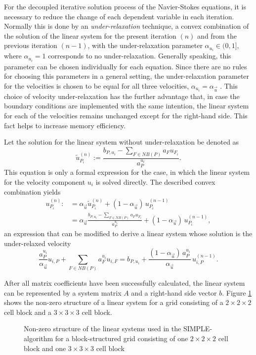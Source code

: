 For the decoupled iterative solution process of the Navier-Stokes equations, it is necessary to reduce the change of each dependent variable in each iteration. Normally this is done by an \emph{under-relaxation} technique, a convex combination of the solution of the linear system for the present iteration \((n)\) and from the previous iteration \((n-1)\), with the under-relaxation parameter \(\alpha_{u_i} \in (0,1]\), where \(\alpha_{u_i} = 1\) corresponds to no under-relaxation. Generally speaking, this parameter can be chosen individually for each equation. Since there are no rules for choosing this parameters in a general setting, the under-relaxation parameter for the velocities is chosen to be equal for all three velocities, \(\alpha_{u_i} = \alpha_{\vec{u}}\) \cite{schaefer99}. This choice of velocity under-relaxation has the further advantage that, in case the boundary conditions are implemented with the same intention, the linear system for each of the velocities remains unchanged except for the right-hand side. This fact helps to increase memory efficiency.

Let the solution for the linear system without under-relaxation be denoted as
\begin{displaymath}
  \tilde{u}_{P_i}^{(n)} := \frac{b_{P,u_i} - \sum_{F \in NB(P)} a_F u_{F_i}}{a_P^{u_i}}.
\end{displaymath}
This equation is only a formal expression for the case, in which the linear system for the velocity component \(u_i\) is solved directly. The described convex combination yields
\begin{align*}
  u_{P_i}^{(n)} :&= \alpha_{\vec{u}} \tilde{u}_{P_i}^{(n)} + (1 - \alpha_{\vec{u}} )\, u_{P_i}^{(n-1)} \\[0.5em]
                 &= \alpha_{\vec{u}} \frac{b_{P,u_i} - \sum_{F \in NB(P)} a_F u_{F_i}}{a_P^{u_i}} + (1 - \alpha_{\vec{u}} )\, u_{P_i}^{(n-1)},
\end{align*}
an expression that can be modified to derive a linear system whose solution is the under-relaxed velocity
\begin{displaymath}
  \frac{a_P^{u_i}}{\alpha_{\vec{u}}} u_{i,P} + \sum_{F \in NB(P)} a_F^{u_i} u_{i,F} 
  = 
  b_{P,u_i} + \frac{(1 - \alpha_{\vec{u}})\, a_P^{u_i}}{\alpha_{\vec{u}}}\, u_{i,P}^{(n-1)}. 
\end{displaymath}

After all matrix coefficients have been successfully calculated, the linear system can be represented by a system matrix \(A\) and a right-hand side vector \(b\). Figure \ref{fig:segassemble} shows the non-zero structure of a linear system for a grid consisting of a \(2\times2\times2\) cell block and a \(3\times3\times3\) cell block.

\begin{figure}
  \centering
  
  \caption{Non-zero structure of the linear systems used in the SIMPLE-algorithm for a block-structured grid consisting of one $2\times2\times2$ cell block and one $3\times3\times3$ cell block}
  \label{fig:segassemble}
\end{figure}

